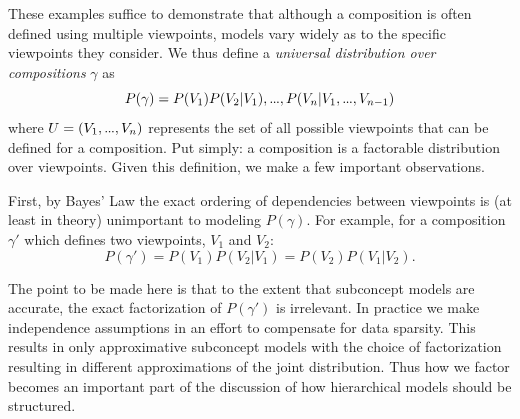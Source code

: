 \documentclass[letterpaper]{article}
\newcommand\mydots{\hbox to .75em{.\hss.\hss.}}
\begin{document}
These examples suffice to demonstrate that although a composition is often defined using multiple viewpoints, models vary widely as to the specific viewpoints they consider. We thus define a \emph{universal distribution over compositions} $\gamma$ as
\[ P(\gamma) = P(V_1) P(V_2|V_1), \mydots, P(V_n|V_1,\mydots,V_{n-1}) \]
\noindent where $U = (V_1, \mydots, V_n)$ represents the set of all possible viewpoints that can be defined for a composition. Put simply: a composition is a factorable distribution over viewpoints. Given this definition, we make a few important observations.

First, by Bayes' Law the exact ordering of dependencies between viewpoints is (at least in theory) unimportant to modeling $P(\gamma)$. For example, for a composition $\gamma'$ which defines two viewpoints, $V_1$ and $V_2$:
\[ P(\gamma') = P(V_1) P(V_2|V_1) = P(V_2) P(V_1|V_2). \]

The point to be made here is that to the extent that subconcept models are accurate, the exact factorization of $P(\gamma')$ is irrelevant. In practice we make independence assumptions in an effort to compensate for data sparsity. This results in only approximative subconcept models with the choice of factorization resulting in different approximations of the joint distribution. Thus how we factor becomes an important part of the discussion of how hierarchical models should be structured.
\end{document}
